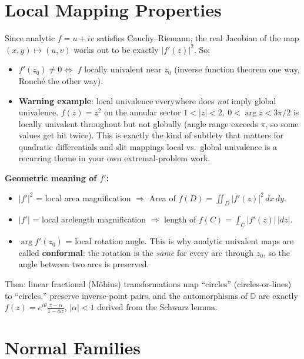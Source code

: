 \documentclass[
]{book}
\providecommand{\tightlist}{%
  \setlength{\itemsep}{0pt}\setlength{\parskip}{0pt}}
\theoremstyle{definition}
\theoremstyle{definition}
\theoremstyle{definition}
\theoremstyle{definition}
\theoremstyle{remark}
\begin{document}
\section{Local Mapping Properties}\label{local-mapping-properties}

Since analytic \(f = u+iv\) satisfies Cauchy--Riemann, the real Jacobian of the map \((x,y)\mapsto(u,v)\) works out to be exactly \(|f'(z)|^2\). So:

\begin{itemize}
\tightlist
\item
  \(f'(z_0)\ne 0 \iff\) \(f\) locally univalent near \(z_0\) (inverse function theorem one way, Rouché the other way).
\item
  \textbf{Warning example}: local univalence everywhere does \emph{not} imply global univalence. \(f(z)=z^2\) on the annular sector \(1<|z|<2,\ 0<\arg z < 3\pi/2\) is locally univalent throughout but not globally (angle range exceeds \(\pi\), so some values get hit twice). This is exactly the kind of subtlety that matters for quadratic differentials and slit mappings local vs.~global univalence is a recurring theme in your own extremal-problem work.
\end{itemize}

\textbf{Geometric meaning of \(f'\):}

\begin{itemize}
\tightlist
\item
  \(|f'|^2\) = local area magnification \(\Rightarrow\) Area of \(f(D) = \iint_D |f'(z)|^2\,dx\,dy\).
\item
  \(|f'|\) = local arclength magnification \(\Rightarrow\) length of \(f(C) = \int_C |f'(z)|\,|dz|\).
\item
  \(\arg f'(z_0)\) = local rotation angle. This is why analytic univalent maps are called \textbf{conformal}: the rotation is the \emph{same} for every arc through \(z_0\), so the angle between two arcs is preserved.
\end{itemize}

Then: linear fractional (Möbius) transformations map ``circles'' (circles-or-lines) to ``circles,'' preserve inverse-point pairs, and the automorphisms of \(\mathbb{D}\) are exactly \(f(z) = e^{i\theta}\frac{z-\alpha}{1-\bar\alpha z}\), \(|\alpha|<1\) derived from the Schwarz lemma.

\section{Normal Families}\label{normal-families}
\end{document}
